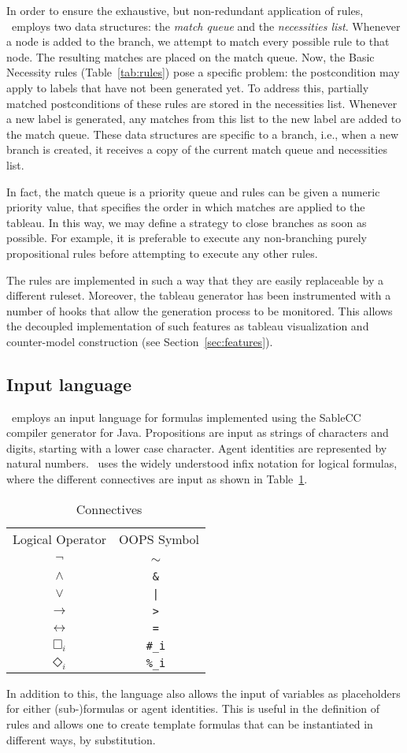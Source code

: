In order to ensure the exhaustive, but non-redundant application of rules,
\oops\ employs two data structures: the {\em match queue} and the {\em
necessities list}.
Whenever a node is added to the branch, we attempt to match every possible
rule to that node. The resulting matches are placed on the match queue. Now,
the Basic Necessity rules (Table~\ref{tab:rules}) pose a specific problem:
the postcondition may apply to labels that have not been generated yet. To
address this, partially matched postconditions of these rules are stored in
the necessities list. Whenever a new label is generated, any matches from this
list to the new label are added to the match queue.
These data structures are specific to a branch, i.e., when
a new branch is created, it receives a copy of the current match queue and
necessities list.

In fact, the match queue is a priority queue and rules can be given a numeric
priority value, that specifies the order in which matches are applied to the
tableau. In this way, we may define a strategy to close branches as soon as
possible. For example, it is preferable to execute any non-branching purely
propositional rules before attempting to execute any other rules.

The rules are implemented in such a way that they are easily replaceable by a
different ruleset. Moreover, the tableau generator has been instrumented with
a number of hooks that allow the generation process to be monitored. This
allows the decoupled implementation of such features as tableau visualization
and counter-model construction (see Section~\ref{sec:features}).

\subsection{Input language}

\oops\ employs an input language for formulas implemented using the SableCC
\citep{gagnon1998} compiler generator for Java. Propositions are input as
strings of characters and digits, starting with a lower case character.  Agent
identities are represented by natural numbers. \oops\ uses the widely
understood infix notation for logical formulas, where the different
connectives are input as shown in Table~\ref{tab:input}.

\begin{table}
\label{tab:input}
\begin{tabular}{cc}
Logical Operator & OOPS Symbol \\
$\neg$ & \tt{$\sim$} \\ 
$\wedge$ & \tt{\&} \\
$\vee$ & \tt{|} \\
$\rightarrow$ & \tt{>} \\
$\leftrightarrow$ & \tt{=} \\
$\Box_i$ & \tt{\#\_i}  \\
$\Diamond_i$ & \tt{\%\_i}  \\
\end{tabular}
\caption{\oops\ Connectives}
\end{table}

In addition to this, the language also allows the input of variables as
placeholders for either (sub-)formulas or agent identities. This is useful in
the definition of rules and allows one to create template formulas that can
be instantiated in different ways, by substitution.
